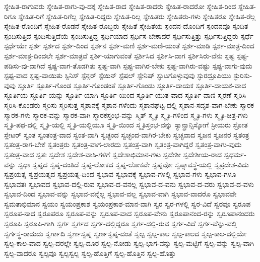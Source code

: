 {ಸ್ನೇಹಿತ-ರಾಗುವರು
ಸ್ನೇಹಿತ-ರಾಗು-ವು-ದಕ್ಕೆ
ಸ್ನೇಹಿತ-ರಾದ
ಸ್ನೇಹಿತ-ರಾದರು
ಸ್ನೇಹಿತ-ರಾದರೋ
ಸ್ನೇಹಿತ-ರಿಂದ
ಸ್ನೇಹಿತ-ರಿಗೂ
ಸ್ನೇಹಿತ-ರಿಗೆ
ಸ್ನೇಹಿತ-ರಿಗೆಲ್ಲ
ಸ್ನೇಹಿತ-ರಿದ್ದರು
ಸ್ನೇಹಿತ-ರಿಲ್ಲ
ಸ್ನೇಹಿತರು
ಸ್ನೇಹಿತರು-ಗಳು
ಸ್ನೇಹಿತರೂ
ಸ್ನೇಹಿತ-ರೆಲ್ಲ
ಸ್ನೇಹಿತ-ರೊಂದಿಗೆ
ಸ್ನೇಹಿತ-ರೊಡನೆ
ಸ್ನೇಹಿತ-ರೊಬ್ಬರು
ಸ್ನೇಹಿತೆ
ಸ್ನೇಹಿತೆಯ
ಸ್ಪಂದನ-ದೊಂದಿಗೆ
ಸ್ಪಂದನವೂ
ಸ್ಪಂದಿತ
ಸ್ಪಂದಿಸುತ್ತಿದೆ
ಸ್ಪಂದಿಸುತ್ತಿದೆಯೆ
ಸ್ಪಂದಿಸುತ್ತಿದ್ದ
ಸ್ಪರ್ಧಿಯಾದ
ಸ್ಪರ್ಧಿಸ-ಬೇಕಾದರೆ
ಸ್ಪರ್ಧಿಸುತ್ತಿತ್ತು
ಸ್ಪರ್ಧಿಸುತ್ತಿದ್ದರು
ಸ್ಪರ್ಧೆ
ಸ್ಪರ್ಧೆಯೇ
ಸ್ಪರ್ಶ
ಸ್ಪರ್ಶದ
ಸ್ಪರ್ಶ-ದಿಂದ
ಸ್ಪರ್ಶನ
ಸ್ಪರ್ಶ-ಮಣಿ
ಸ್ಪರ್ಶ-ಮಣಿ-ಯಂತೆ
ಸ್ಪರ್ಶ-ಮಾಡಿ
ಸ್ಪರ್ಶ-ಮಾತ್ರ-ದಿಂದ
ಸ್ಪರ್ಶ-ಮಾತ್ರ-ದಿಂದಲೇ
ಸ್ಪರ್ಶ-ಮಾತ್ರವೆ
ಸ್ಪರ್ಶಿ-ಯಾಗುವಂತೆ
ಸ್ಪರ್ಶಿಸಿದ
ಸ್ಪರ್ಶಿಸಿ-ದಾಗ
ಸ್ಪರ್ಶಿಸಿರು-ವೆನು
ಸ್ಪಷ್ಟ
ಸ್ಪಷ್ಟ-ಪಡಿಸು-ವು-ದಾಗಿದೆ
ಸ್ಪಷ್ಟ-ವಾಗ-ತೊಡಗಿತು
ಸ್ಪಷ್ಟ-ವಾಗಿ
ಸ್ಪಷ್ಟ-ವಾಗಿರ-ಬೇಕು
ಸ್ಪಷ್ಟ-ವಾಗಿರು-ವಷ್ಟು
ಸ್ಪಷ್ಟ-ವಾಗು-ವುದು
ಸ್ಪಷ್ಟ-ವಾದ
ಸ್ಪಷ್ಟ-ವಾಯಿತು
ಸ್ಪಿನಿಸ್
ಸ್ಪೆನ್ಸರ್
ಸ್ಪೆಯಿನ್
ಸ್ಪೆಷಲ್
ಸ್ಪೇನಿಷ್
ಸ್ಫುಟಗೊಳ್ಳುವುವು
ಸ್ಫುರದ್ರೂಪಿಯು
ಸ್ಫುರಿಸು-ವುವು
ಸ್ಫೂರ್ತಿ
ಸ್ಫೂರ್ತಿ-ಗೊಂಡ
ಸ್ಫೂರ್ತಿ-ಗೊಂಡಂತೆ
ಸ್ಫೂರ್ತಿ-ಗೊಂಡು
ಸ್ಫೂರ್ತಿ-ದಾಯಕ
ಸ್ಫೂರ್ತಿ-ದಾಯಕ-ವಾದ
ಸ್ಫೂರ್ತಿಯ
ಸ್ಫೂರ್ತಿ-ಯನ್ನು
ಸ್ಫೂರ್ತಿ-ಯಾಗಿ
ಸ್ಫೂರ್ತಿ-ಯಿಂದ
ಸ್ಫೂರ್ತಿ-ಯುತ-ವಾದ
ಸ್ಫೂರ್ತಿ-ವಾಣಿ
ಸ್ಮರಣೆ
ಸ್ಮರಿಸಿ
ಸ್ಮರಿಸಿ-ಕೊಂಡರು
ಸ್ಮರಿಸು
ಸ್ಮರಿಸುತ್ತ
ಸ್ಮಶಾನಕ್ಕೆ
ಸ್ಮಶಾನ-ಗಳೆಂದು
ಸ್ಮಶಾನಘಟ್ಟ-ದಲ್ಲಿ
ಸ್ಮಶಾನ-ಸದೃಶ-ವಾಗ-ಬೇಕು
ಸ್ಮಾರಕ
ಸ್ಮಾರಕ-ಗಳು
ಸ್ಮಾರಕ-ವನ್ನು
ಸ್ಮಾರಕ-ವಾಗಿ
ಸ್ಮಾರಕಸ್ತಂಭ-ವನ್ನು
ಸ್ಮಿತ್
ಸ್ಮೃತಿ
ಸ್ಮೃತಿ-ಗಳಿಂದ
ಸ್ಮೃತಿ-ಗಳು
ಸ್ಮೃತಿ-ಚಿತ್ರ-ಗಳು
ಸ್ಮೃತಿ-ಪಥ-ದಲ್ಲಿ
ಸ್ಮೃತಿ-ಯಲ್ಲಿ
ಸ್ಮೃತಿ-ಯಲ್ಲಿಯೂ
ಸ್ಮೃತಿ-ಯಿಂದ
ಸ್ಮೃತಿಸ್ತಂಭ-ವನ್ನು
ಸ್ಯಾನ್ಫ್ರಾನ್ಸಿಸ್ಕೋಗೆ
ಸ್ರೀಯರು
ಸ್ರೋತ
ಸ್ಲೇಟರ್
ಸ್ವಂತ
ಸ್ವಂತಂತ್ರ-ವಾದ
ಸ್ವಂತ-ವಾಗಿ
ಸ್ವಚ್ಛಂದ
ಸ್ವಚ್ಛಂದ-ವಾಗಿರ-ಬೇಕು
ಸ್ವಚ್ಛವಾದ
ಸ್ವಜನ
ಸ್ವಜನರ
ಸ್ವತಂತ್ರ
ಸ್ವತಂತ್ರ-ರಾಗ-ಬೇಕೆ
ಸ್ವತಂತ್ರರು
ಸ್ವತಂತ್ರ-ವಾಗ-ಲಾರದು
ಸ್ವತಂತ್ರ-ವಾಗಿ
ಸ್ವತಂತ್ರ-ವಾಗಿದ್ದರೆ
ಸ್ವತಂತ್ರ-ವಾಗು-ವುದು
ಸ್ವತಂತ್ರ-ವಾದ
ಸ್ವತಃ
ಸ್ವದೇಶ
ಸ್ವದೇಶ-ವಾಸಿ-ಗಳಿಗೆ
ಸ್ವದೇಶಾಭಿಮಾನ-ಗಳು
ಸ್ವದೇಶೀ
ಸ್ವದೇಶೀಯ-ರಾದ
ಸ್ವಧರ್ಮ-ವನ್ನು
ಸ್ವಧಾ
ಸ್ವಪ್ನದ
ಸ್ವಪ್ನ-ದಂತಿದೆ
ಸ್ವಪ್ನ-ಲೋಕದ
ಸ್ವಪ್ನ-ಲೋಕವೇ
ಸ್ವಪ್ನವೋ
ಸ್ವಪ್ನಾವಸ್ಥೆ-ಯಲ್ಲಿ
ಸ್ವಪ್ರದೇಶ-ವಿದು
ಸ್ವಪ್ರಯತ್ನ
ಸ್ವಪ್ರಯತ್ನದ
ಸ್ವಪ್ರಯತ್ನ-ದಿಂದ
ಸ್ವಭಾವ
ಸ್ವಭಾವಕ್ಕೆ
ಸ್ವಭಾವ-ಗಳಲ್ಲಿ
ಸ್ವಭಾವ-ಗಳು
ಸ್ವಭಾವ-ಗಳೂ
ಸ್ವಭಾವತಃ
ಸ್ವಭಾವದ
ಸ್ವಭಾವ-ದಲ್ಲಿ-ರುವ
ಸ್ವಭಾವ-ದ-ವನಲ್ಲ
ಸ್ವಭಾವ-ದ-ವನು
ಸ್ವಭಾವ-ದ-ವರು
ಸ್ವಭಾವ-ದ-ವಳು
ಸ್ವಭಾವ-ದಿಂದ
ಸ್ವಭಾವ-ವನ್ನು
ಸ್ವಭಾವ-ವನ್ನೆಲ್ಲ
ಸ್ವಭಾವ-ವಲ್ಲ
ಸ್ವಭಾವ-ವಾಗಿ
ಸ್ವಭಾವ-ವಾದರೊ
ಸ್ವಭಾವವೇ
ಸ್ವಮತಾಭಿಮಾನ
ಸ್ವಯಂ
ಸ್ವಯಂಪ್ರಕಾಶ
ಸ್ವಯಂಪ್ರಕಾಶ-ಮಾನ-ವಾಗಿ
ಸ್ವರ
ಸ್ವರ-ಗಳಲ್ಲಿ
ಸ್ವರ-ವಿದೆ
ಸ್ವರವೂ
ಸ್ವರೂಪ
ಸ್ವರೂಪ-ನಾದ
ಸ್ವರೂಪರೂ
ಸ್ವರೂಪ-ವನ್ನು
ಸ್ವರೂಪ-ವಾದ
ಸ್ವರೂಪ-ವೇನು
ಸ್ವರೂಪಾನಂದ-ರನ್ನು
ಸ್ವರೂಪಾನಂದರು
ಸ್ವರೂಪಿ
ಸ್ವರೂಪಿ-ಗಾಗಿ
ಸ್ವರ್ಗ
ಸ್ವರ್ಗದ
ಸ್ವರ್ಗ-ದಲ್ಲಿದ್ದರೂ
ಸ್ವರ್ಗ-ದಲ್ಲಿ-ರುವ
ಸ್ವರ್ಗ-ವಿದೆ
ಸ್ವರ್ಗ-ವೆನ್ನು-ವಲ್ಲಿ
ಸ್ವರ್ಗಸ್ಥ-ರಾದುದು
ಸ್ವರ್ಗಾದಿ
ಸ್ವರ್ಣಸ್ವಪ್ನ
ಸ್ವರ್ಣಸ್ವಪ್ನ-ದಂತೆ
ಸ್ವಲ್ಪ
ಸ್ವಲ್ಪ-ಕಾಲ
ಸ್ವಲ್ಪ-ಕಾಲದ
ಸ್ವಲ್ಪ-ಕಾಲ-ದಲ್ಲಿಯೇ
ಸ್ವಲ್ಪ-ಕಾಲ-ವಾದ
ಸ್ವಲ್ಪ-ದರಲ್ಲೇ
ಸ್ವಲ್ಪ-ದೂರ
ಸ್ವಲ್ಪ-ನೋಡು
ಸ್ವಲ್ಪ-ಭಾಗ-ವನ್ನು
ಸ್ವಲ್ಪ-ಮಟ್ಟಿಗೆ
ಸ್ವಲ್ಪ-ವನ್ನು
ಸ್ವಲ್ಪ-ವಾಗಿ
ಸ್ವಲ್ಪ-ವಾದರೂ
ಸ್ವಲ್ಪವೂ
ಸ್ವಲ್ಪಸ್ವಲ್ಪ
ಸ್ವಲ್ಪ-ಹೊತ್ತಿಗೆ
ಸ್ವಲ್ಪ-ಹೊತ್ತಿನ
ಸ್ವಲ್ಪ-ಹೊತ್ತು
}
